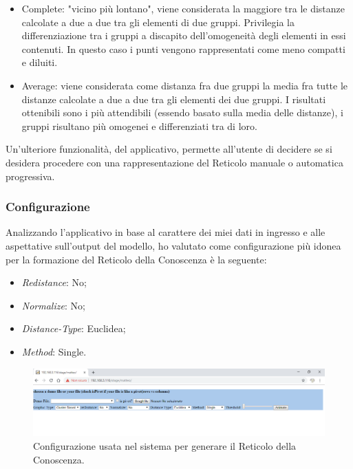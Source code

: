 \begin{itemize}
\begin{itemize}
\item Complete: "vicino pi\`u lontano", viene considerata la maggiore tra le distanze calcolate a due a due tra gli elementi di due gruppi. Privilegia la differenziazione tra i gruppi a discapito dell'omogeneit\`a degli elementi in essi contenuti. In questo caso i punti vengono rappresentati come meno compatti e diluiti.
\item Average: viene considerata come distanza fra due gruppi la media fra tutte le distanze calcolate a due a due tra gli elementi dei due gruppi. I risultati ottenibili sono i pi\`u attendibili (essendo basato sulla media delle distanze), i gruppi risultano pi\`u omogenei e differenziati tra di loro.
\end{itemize}
\end{itemize}
\noindent
Un'ulteriore funzionalit\`a, del applicativo, permette all'utente di decidere se si desidera procedere con una rappresentazione del Reticolo manuale o automatica progressiva.

\subsubsection{Configurazione}
\label{configurazione}
Analizzando l'applicativo in base al carattere dei miei dati in ingresso e alle aspettative sull'output del modello, ho valutato come configurazione pi\`u idonea per la formazione del Reticolo della Conoscenza \`e la seguente:
\begin{itemize}
\item \textit{Redistance}: No;
\item  \textit{Normalize}: No;
\item \textit{Distance-Type}: Euclidea;
\item \textit{Method}: Single.
\end{itemize}
\noindent
\begin{figure}[H]
\centering
	\includegraphics[width=1\linewidth]{./image/img-configurazione_reticolo.png}
	\caption{Configurazione usata nel sistema per generare il Reticolo della Conoscenza.}
	\label{Configurazione usata nel sistema per generare il Reticolo della Conoscenza.}
\end{figure}
\noindent

